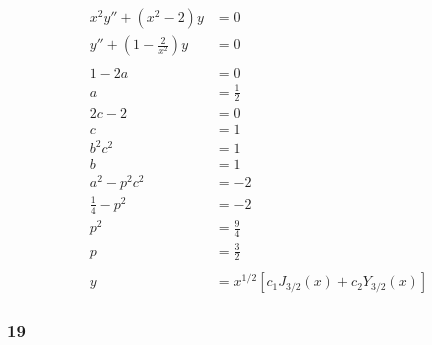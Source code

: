 \documentclass{article}
\begin{document}
\begin{align*}
  x^2 y'' + (x^2 - 2) y                    & = 0                                               \\
  y'' + \left( 1 - \frac{2}{x^2} \right) y & = 0                                               \\ \\
  1 - 2 a                                  & = 0                                               \\
  a                                        & = \frac{1}{2}                                     \\
  2 c - 2                                  & = 0                                               \\
  c                                        & = 1                                               \\
  b^2 c^2                                  & = 1                                               \\
  b                                        & = 1                                               \\
  a^2 - p^2 c^2                            & = -2                                              \\
  \frac{1}{4} - p^2                        & = -2                                              \\
  p^2                                      & = \frac{9}{4}                                     \\
  p                                        & = \frac{3}{2}                                     \\ \\
  y                                        & = x^{1 / 2} [c_1 J_{3 / 2}(x) + c_2 Y_{3 / 2}(x)]
\end{align*}

\subsubsection{19}
\end{document}
